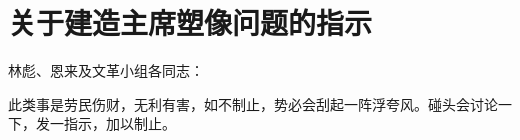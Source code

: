 \section[关于建造主席塑像问题的指示（一九六七年七月五日）]{关于建造主席塑像问题的指示}


\noindent 林彪、恩来及文革小组各同志：

此类事是劳民伤财，无利有害，如不制止，势必会刮起一阵浮夸风。碰头会讨论一下，发一指示，加以制止。



